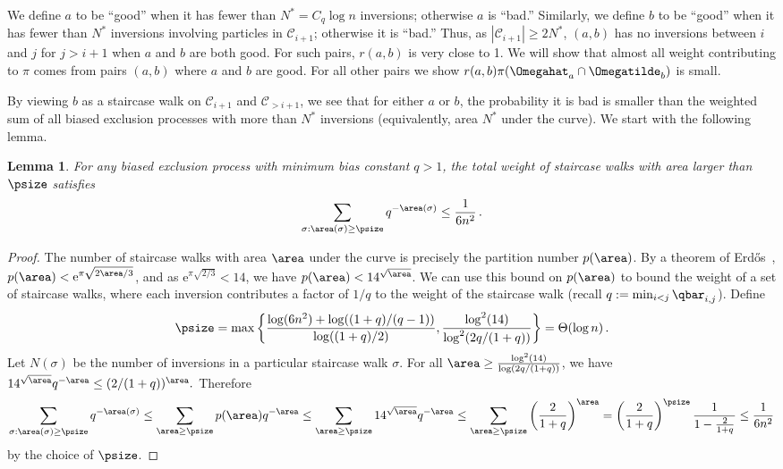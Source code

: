 \documentclass[11pt]{article}
\newtheorem{lemma}[theorem]{Lemma}
\providecommand{\eee}{\mathrm e}
\begin{document}
We define $a$ to be ``good'' when it has fewer than $N^*=C_q\log n$ 
inversions; otherwise $a$ is ``bad.''  Similarly, we define $b$ to be 
``good'' when it has fewer than $N^*$ inversions involving particles in 
$\mathcal{C}_{i+1}$; otherwise it is ``bad.''  Thus, as 
$|\mathcal{C}_{i+1}| \geq 2N^*$, $(a,b)$ has no inversions between $i$ 
and $j$ for $j>i+1$ when $a$ and $b$ are both good.  For such pairs, 
$r(a,b)$ is very close to 1.  We will show that almost all weight 
contributing to $\pi$ comes from pairs $(a,b)$ where $a$ and $b$ 
are good.  For all other pairs we show 
$r(a,b)\pi(\Omegahat_a\cap\Omegatilde_{b})$ is small.  

By viewing $b$ 
as a staircase walk on $\mathcal{C}_{i+1}$ and $\mathcal{C}_{> i+1}$, 
we see that for either $a$ or $b$, the 
probability it is bad is smaller than the weighted sum of all biased 
exclusion processes with more than $N^*$ inversions (equivalently, area 
$N^*$ under the curve).  We start with the following lemma.

\begin{lemma}\label{lem:partitions}
For any biased exclusion process with minimum bias constant $q > 1$, 
the total weight of staircase walks with area larger than $\psize$ satisfies 
\[\sum_{\sigma:\area(\sigma)\geq \psize}q^{-\area(\sigma)} \leq \frac{1}{6n^2}\,.\]
\end{lemma}

\begin{proof}


The number of staircase walks with area $\area$ under the curve is 
precisely the partition number $p(\area)$.  By a theorem of 
Erd\H{o}s~\cite{Erdos42}, $p(\area) < \eee^{\pi\sqrt{2\area/3}}$,
and as $\eee^{\pi\sqrt{2/3}}<14$, we have $p(\area) < 14^{\sqrt{\area}}$.
We can use this bound on $p(\area)$ to bound 
the weight of a set of staircase walks, where each inversion 
contributes a factor of $1/q$ to the weight of the staircase walk 
(recall $q:=\min_{i<j} \qbar_{i,j}$).  
Define 
\[\psize = \max\left\{\frac{\log (6n^2)+\log((1+q)/(q-1))}{\log((1+q)/2)}, \frac{\log^2(14)}{\log^2(2q/(1+q))}\right\} = \Theta(\log n)\,.\]
  Let $N(\sigma)$ be the number of inversions in a particular staircase walk $\sigma$.  
  For all $\area\geq
  \frac{\log^2(14)}{\log(2q/(1+q))}$, we have $14^{\sqrt{\area}}q^{-\area}\leq (2/(1+q))^\area.$
  Therefore 
\[  \sum_{\sigma:\area(\sigma)\geq \psize}q^{-\area(\sigma)}\leq \sum_{\area\geq
    \psize}p(\area)q^{-\area} \leq \sum_{\area\geq \psize}14^{\sqrt{\area}}q^{-\area}
%
  \leq \sum_{\area\geq \psize}\left(\frac{2}{1+q}\right)^{\area}  %
     =\left(\frac{2}{1+q}\right)^{\psize}\frac{1}{1-\frac{2}{1+q}}
       \leq \frac{1}{6n^2}\]
by the choice of $\psize$.        
\end{proof}
\end{document}
